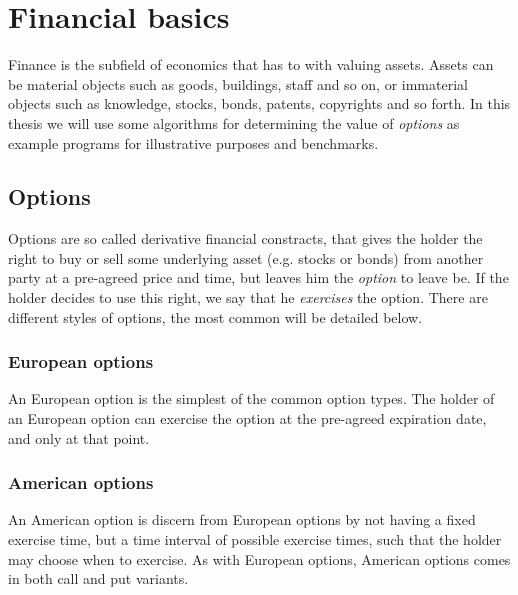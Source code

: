 \chapter{Financial basics}
Finance is the subfield of economics that has to with valuing
assets. Assets can be material objects such as goods, buildings, staff
and so on, or immaterial objects such as knowledge, stocks, bonds,
patents, copyrights and so forth. In this thesis we will use some
algorithms for determining the value of \textit{options} as example
programs for illustrative purposes and benchmarks.

\section{Options}
Options are so called derivative financial constracts, that gives the
holder the right to buy or sell some underlying asset (e.g. stocks or
bonds) from another party at a pre-agreed price and time, but leaves
him the \textit{option} to leave be. If the holder decides to use this
right, we say that he \textit{exercises} the option. There are
different styles of options, the most common will be detailed below.

\subsection{European options}
An European option is the simplest of the common option types. The
holder of an European option can exercise the option at the pre-agreed
expiration date, and only at that point.





\subsection{American options}
An American option is discern from European options by not having a
fixed exercise time, but a time interval of possible exercise times,
such that the holder may choose when to exercise. As with European
options, American options comes in both call and put variants.





